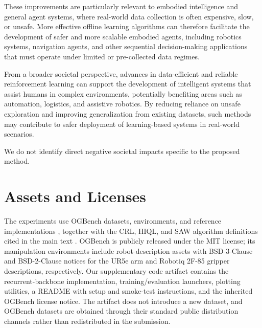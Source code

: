 \documentclass{article}
\begin{document}
These improvements are particularly relevant to embodied intelligence and general agent systems, where real-world data collection is often expensive, slow, or unsafe. More effective offline learning algorithms can therefore facilitate the development of safer and more scalable embodied agents, including robotics systems, navigation agents, and other sequential decision-making applications that must operate under limited or pre-collected data regimes.

From a broader societal perspective, advances in data-efficient and reliable reinforcement learning can support the development of intelligent systems that assist humans in complex environments, potentially benefiting areas such as automation, logistics, and assistive robotics. By reducing reliance on unsafe exploration and improving generalization from existing datasets, such methods may contribute to safer deployment of learning-based systems in real-world scenarios.

We do not identify direct negative societal impacts specific to the proposed method.

\section{Assets and Licenses}\label{app:assets}

The experiments use OGBench datasets, environments, and reference implementations \citep{ogbench}, together with the CRL, HIQL, and SAW algorithm definitions cited in the main text \citep{crl, hiql, saw}.
OGBench is publicly released under the MIT license; its manipulation environments include robot-description assets with BSD-3-Clause and BSD-2-Clause notices for the UR5e arm and Robotiq 2F-85 gripper descriptions, respectively.
Our supplementary code artifact contains the recurrent-backbone implementation, training/evaluation launchers, plotting utilities, a README with setup and smoke-test instructions, and the inherited OGBench license notice.
The artifact does not introduce a new dataset, and OGBench datasets are obtained through their standard public distribution channels rather than redistributed in the submission.

\newpage

\end{document}
